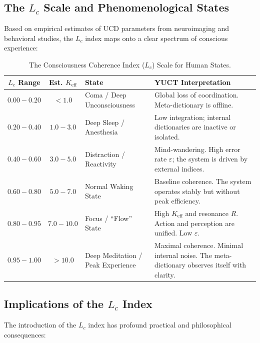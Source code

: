 \documentclass[12pt,a4paper]{article}
\begin{document}
	\subsection{The \(L_c\) Scale and Phenomenological States}
	
	Based on empirical estimates of UCD parameters from neuroimaging and behavioral studies, the \(L_c\) index maps onto a clear spectrum of conscious experience:
	
	\begin{table}[H]
		\centering
		\caption{The Consciousness Coherence Index (\(L_c\)) Scale for Human States.}
		\label{tab:Lc-scale}
		\begin{tabular}{c c l p{6cm}}
			\toprule
			\textbf{\(L_c\) Range} & \textbf{Est. \(K_{\mathrm{eff}}\)} & \textbf{State} & \textbf{YUCT Interpretation} \\
			\midrule
			\(0.00 - 0.20\) & \(< 1.0\) & Coma / Deep Unconsciousness & Global loss of coordination. Meta-dictionary is offline. \\
			\(0.20 - 0.40\) & \(1.0 - 3.0\) & Deep Sleep / Anesthesia & Low integration; internal dictionaries are inactive or isolated. \\
			\(0.40 - 0.60\) & \(3.0 - 5.0\) & Distraction / Reactivity & Mind-wandering. High error rate \(\varepsilon\); the system is driven by external indices. \\
			\(0.60 - 0.80\) & \(5.0 - 7.0\) & Normal Waking State & Baseline coherence. The system operates stably but without peak efficiency. \\
			\(0.80 - 0.95\) & \(7.0 - 10.0\) & Focus / ``Flow'' State & High \(K_{\mathrm{eff}}\) and resonance \(R\). Action and perception are unified. Low \(\varepsilon\). \\
			\(0.95 - 1.00\) & \(> 10.0\) & Deep Meditation / Peak Experience & Maximal coherence. Minimal internal noise. The meta-dictionary observes itself with clarity. \\
			\bottomrule
		\end{tabular}
	\end{table}
	
	\subsection{Implications of the \(L_c\) Index}
	
	The introduction of the \(L_c\) index has profound practical and philosophical consequences:
	
\end{document}
